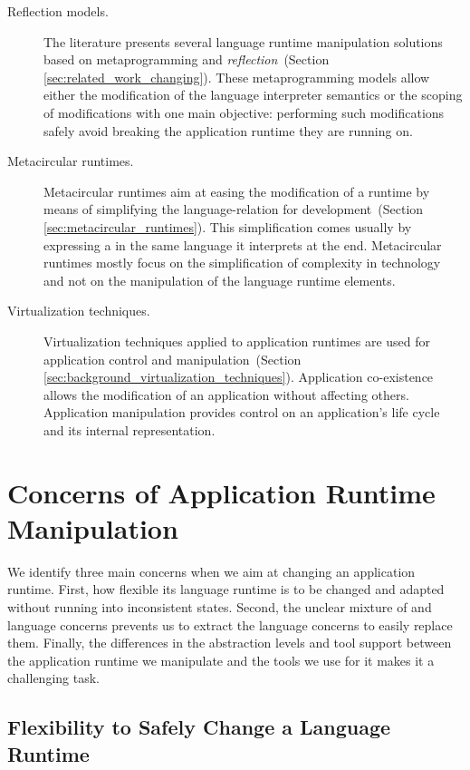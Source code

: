\begin{description}

\item[Reflection models.] The literature presents several language runtime manipulation solutions based on metaprogramming and \emph{reflection}~(Section \ref{sec:related_work_changing}). These metaprogramming models allow either the modification of the language interpreter semantics or the scoping of modifications with one main objective: performing such modifications safely \ie avoid breaking the application runtime they are running on.

\item[Metacircular runtimes.] Metacircular runtimes aim at easing the modification of a runtime by means of simplifying the language-\VM relation for development~(Section \ref{sec:metacircular_runtimes}). This simplification comes usually by expressing a \VM in the same language it interprets at the end. Metacircular runtimes mostly focus on the simplification of complexity in \VM technology and not on the manipulation of the language runtime elements.

\item[Virtualization techniques.] Virtualization techniques applied to application runtimes are used for application control and manipulation~(Section \ref{sec:background_virtualization_techniques}). Application co-existence allows the modification of an application without affecting others. Application manipulation provides control on an application's life cycle and its internal representation.

\end{description}

\section{Concerns of Application Runtime Manipulation} \label{sec:bootstrapping_problems}

We identify three main concerns when we aim at changing an application runtime. First, how flexible its language runtime is to be changed and adapted without running into inconsistent states. Second, the unclear mixture of \VM and language concerns prevents us to extract the language concerns to easily replace them. Finally, the differences in the abstraction levels and tool support between the application runtime we manipulate and the tools we use for it makes it a challenging task.


\subsection{Flexibility to Safely Change a Language Runtime}

